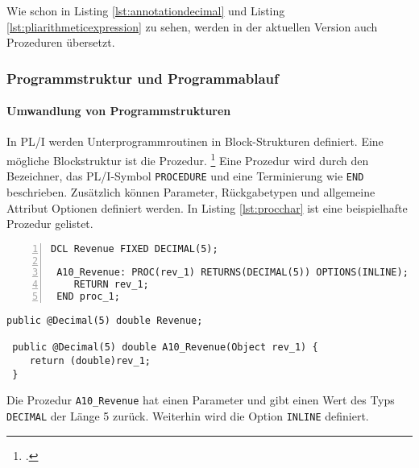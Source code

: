 Wie schon in Listing \ref{lst:annotationdecimal} und Listing \ref{lst:pliarithmeticexpression} zu sehen, werden in der aktuellen Version auch Prozeduren übersetzt.


\subsubsection{Programmstruktur und Programmablauf}
\paragraph*{Umwandlung von Programmstrukturen }\label{programstruct}

In PL/I werden Unterprogrammroutinen in Block-Strukturen definiert. Eine mögliche Blockstruktur ist die Prozedur. \footcite[Vgl. ][S. 97ff. ]{pliref}
Eine Prozedur wird durch den Bezeichner, das PL/I-Symbol \verb+PROCEDURE+ und eine Terminierung wie \verb+END+ beschrieben.
Zusätzlich können Parameter, Rückgabetypen und allgemeine Attribut Optionen definiert werden. In Listing \ref{lst:procchar} ist eine beispielhafte Prozedur gelistet.

\begin{minipage}[b]{0.48\linewidth}
	\centering
	\lstset{language=PL/I,label=SliceExaple}
	\begin{lstlisting}[frame=single, numbers=left, mathescape,%
		caption={Transformation einer Prozedur}, label={lst:procchar},
		basicstyle=\fontsize{9}{13}\selectfont\ttfamily]
 DCL Revenue FIXED DECIMAL(5);
		
 A10_Revenue: PROC(rev_1) RETURNS(DECIMAL(5)) OPTIONS(INLINE);
 	RETURN rev_1;
 END proc_1;
	\end{lstlisting}
\end{minipage}
\hspace{0.5cm}
\begin{minipage}[b]{0.48\linewidth}
	\centering
	\lstset{language=Java,label=SliceExaple}
	\begin{lstlisting}[frame=single, mathescape,%
		title={" "},
		basicstyle=\fontsize{9}{13}\selectfont\ttfamily]
 public @Decimal(5) double Revenue;		
		
 public @Decimal(5) double A10_Revenue(Object rev_1) { 
 	return (double)rev_1;
 }
	\end{lstlisting}
\end{minipage}

Die Prozedur \verb+A10_Revenue+ hat einen Parameter und gibt einen Wert des Typs \verb+DECIMAL+ der L\"ange 5 zur\"uck.
Weiterhin wird die Option \verb+INLINE+ definiert.

